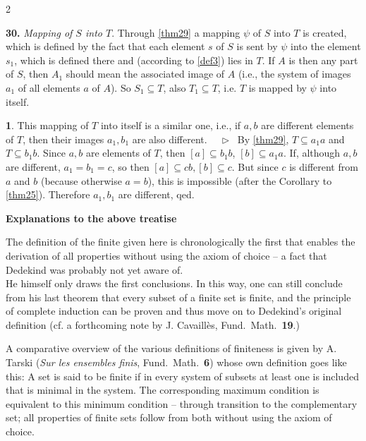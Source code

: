 \documentclass[leqno,hidelinks,10pt]{article}
\theoremstyle{definition}
\newtheorem{satz}{\protect\satzname}
\newcommand{\satzname}{}
\renewcommand{\satzname}{\hspace{-4pt}.\ Satz}%
\renewcommand{\satzname}{\hspace{-4pt}.\ Theorem}%
\newcommand\Beweis{\medskip \newline $ \phantom{'.'} \rhd \ $}%
\newcommand{\partof}{\subseteq}
\newcommand{\sref}[1]{\underline{\ref{#1}}}%
\begin{document}
\begin{paracol}{2}
\begin{rightcolumn}
\noindent \textbf{30.}\label{thm30} \hspace{-9pt} \emph{Mapping of $S$ into $T$}.
Through \sref{thm29} a mapping $\psi$ of $S$ into $T$ is
created, which is defined by the fact that each element $s$ of $S$ is sent by
$\psi$ into the element $s_1$, which is defined there and (according to \sref{def3})
lies in $T$. If $A$ is then any part of $S$, then $A_1$ should mean the associated
image of $A$ (i.e., the system of images $a_1$ of all elements $a$ of $A$). So
$S_1 \partof T$, also $T_1 \partof T$, i.e. $T$ is mapped by $\psi$ into itself.

\begin{satz}\label{thm31} 
This mapping of $T$ into itself is a similar one, i.e., if $a, b$ are different
elements of $T$, then their images $a_1, b_1$ are also different.%
\Beweis
By \sref{thm29}, $T \partof a_1a$ and $T \partof b_1b$. Since $a, b$ are elements
of $T$, then $[a] \partof b_1b$, $[b] \partof a_1a$. If, although $a, b$ are
different, $a_1 = b_1  = c$, so then $[a] \partof cb, [b] \partof c$. But since
$c$ is different from $a$ and $b$ (because otherwise $a = b$), this is impossible
(after the Corollary to \sref{thm25}). Therefore $a_1, b_1$ are different, qed.
\end{satz}

\newpage

\hspace{84pt}

\begin{center}{\Large\textbf{Explanations to the above treatise \ \\ }}
\end{center}

\vspace{30pt}

\fontsize{9}{9}\selectfont
\justifying
The definition of the finite given here is chronologically the first that enables
the derivation of all properties without using the axiom of choice -- a fact that
Dedekind was probably not yet aware of. \\

He himself only draws the first conclusions. In this way, one can still conclude
from his last theorem that every subset of a finite set is finite, and the principle
of complete induction can be proven and thus move on to Dedekind's original
definition (cf. a forthcoming note by J. Cavaillès, Fund.\ Math.\ \textbf{19}.)
\ \\
\smallskip

A comparative overview of the various definitions of finiteness is given by A.
Tarski (\emph{Sur les ensembles finis}, Fund.\ Math.\ \textbf{6}) whose own
definition goes like this: A set is said to be finite if in every system of
subsets at least one is included that is minimal in the system. The corresponding
maximum condition is equivalent to this minimum condition -- through transition to the
complementary set; all properties of finite sets follow from both without using
the axiom of choice.
\ \\



\end{rightcolumn}
\end{paracol}
\end{document}
